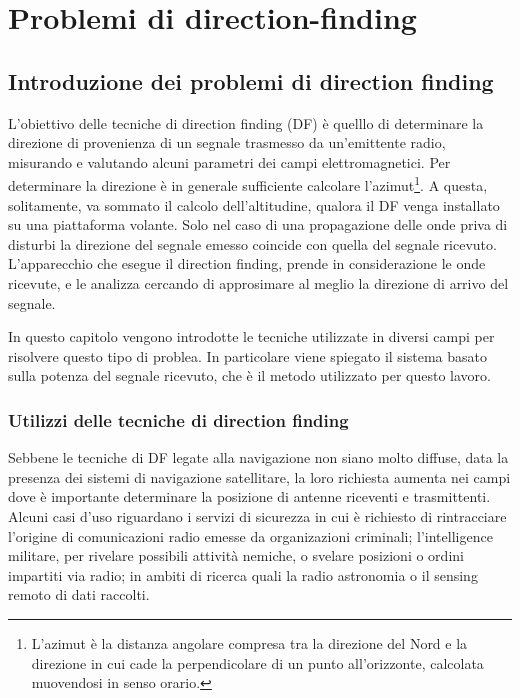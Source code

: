 \chapter{Problemi di direction-finding}
\section{Introduzione dei problemi di direction finding}

L'obiettivo delle tecniche di direction finding (DF) è quelllo di determinare la direzione di provenienza di un segnale trasmesso da un'emittente radio, misurando e valutando alcuni parametri dei campi elettromagnetici. Per determinare la direzione è in generale sufficiente calcolare l'azimut\footnote{L'azimut è la distanza angolare compresa tra la direzione del Nord e la direzione in cui cade la perpendicolare di un punto all'orizzonte, calcolata muovendosi in senso orario.}. A questa, solitamente, va sommato il calcolo dell'altitudine, qualora il DF venga installato su una piattaforma volante. Solo nel caso di una propagazione delle onde priva di disturbi la direzione del segnale emesso coincide con quella del segnale ricevuto. L'apparecchio che esegue il direction finding, prende in considerazione le onde ricevute, e le analizza cercando di approsimare al meglio la direzione di arrivo del segnale.

In questo capitolo vengono introdotte le tecniche utilizzate in diversi campi per risolvere questo tipo di problea. In particolare viene spiegato il sistema basato sulla potenza del segnale ricevuto, che è il metodo utilizzato per questo lavoro. 

\subsection{Utilizzi delle tecniche di direction finding}
Sebbene le tecniche di DF legate alla navigazione non siano molto diffuse, data la presenza dei sistemi di navigazione satellitare, la loro richiesta aumenta nei campi dove è importante determinare la posizione di antenne riceventi e trasmittenti. Alcuni casi d'uso riguardano i servizi di sicurezza in cui è richiesto di rintracciare l'origine di comunicazioni radio emesse da organizazioni criminali; l'intelligence militare, per rivelare possibili attività nemiche, o svelare posizioni o ordini impartiti via radio; in ambiti di ricerca quali la radio astronomia o il sensing remoto di dati raccolti. 

